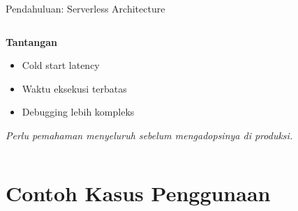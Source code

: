 \documentclass[aspectratio=169, table]{beamer}
\begin{document}
\begin{frame}[fragile]{Pendahuluan: Serverless Architecture}
\begin{columns}[T]
\begin{column}{0.4\textwidth}
				\textbf{Tantangan}
				\begin{itemize}
					\item Cold start latency
					\item Waktu eksekusi terbatas
					\item Debugging lebih kompleks
				\end{itemize}
				
				\vspace{4pt}
				\scriptsize
				\textit{Perlu pemahaman menyeluruh sebelum mengadopsinya di produksi.}
			\end{column}
		\end{columns}
	\end{frame}
	
	
	
\section{Contoh Kasus Penggunaan}
	
\end{document}
